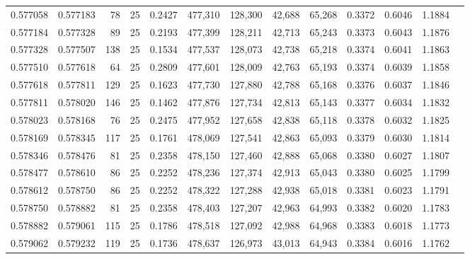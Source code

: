 \begin{tabular}{rrrrrrrrrrrrr}
0.577058 & 0.577183 &    78 &  25 &                                     0.2427 & 477,310 & 128,300 &  42,688 &  65,268 & 0.3372 & 0.6046 & 1.1884 \\
0.577184 & 0.577328 &    89 &  25 &                                     0.2193 & 477,399 & 128,211 &  42,713 &  65,243 & 0.3373 & 0.6043 & 1.1876 \\
0.577328 & 0.577507 &   138 &  25 &                                     0.1534 & 477,537 & 128,073 &  42,738 &  65,218 & 0.3374 & 0.6041 & 1.1863 \\
0.577510 & 0.577618 &    64 &  25 &                                     0.2809 & 477,601 & 128,009 &  42,763 &  65,193 & 0.3374 & 0.6039 & 1.1858 \\
0.577618 & 0.577811 &   129 &  25 &                                     0.1623 & 477,730 & 127,880 &  42,788 &  65,168 & 0.3376 & 0.6037 & 1.1846 \\
0.577811 & 0.578020 &   146 &  25 &                                     0.1462 & 477,876 & 127,734 &  42,813 &  65,143 & 0.3377 & 0.6034 & 1.1832 \\
0.578023 & 0.578168 &    76 &  25 &                                     0.2475 & 477,952 & 127,658 &  42,838 &  65,118 & 0.3378 & 0.6032 & 1.1825 \\
0.578169 & 0.578345 &   117 &  25 &                                     0.1761 & 478,069 & 127,541 &  42,863 &  65,093 & 0.3379 & 0.6030 & 1.1814 \\
0.578346 & 0.578476 &    81 &  25 &                                     0.2358 & 478,150 & 127,460 &  42,888 &  65,068 & 0.3380 & 0.6027 & 1.1807 \\
0.578477 & 0.578610 &    86 &  25 &                                     0.2252 & 478,236 & 127,374 &  42,913 &  65,043 & 0.3380 & 0.6025 & 1.1799 \\
0.578612 & 0.578750 &    86 &  25 &                                     0.2252 & 478,322 & 127,288 &  42,938 &  65,018 & 0.3381 & 0.6023 & 1.1791 \\
0.578750 & 0.578882 &    81 &  25 &                                     0.2358 & 478,403 & 127,207 &  42,963 &  64,993 & 0.3382 & 0.6020 & 1.1783 \\
0.578882 & 0.579061 &   115 &  25 &                                     0.1786 & 478,518 & 127,092 &  42,988 &  64,968 & 0.3383 & 0.6018 & 1.1773 \\
0.579062 & 0.579232 &   119 &  25 &                                     0.1736 & 478,637 & 126,973 &  43,013 &  64,943 & 0.3384 & 0.6016 & 1.1762 \\

\end{tabular}
